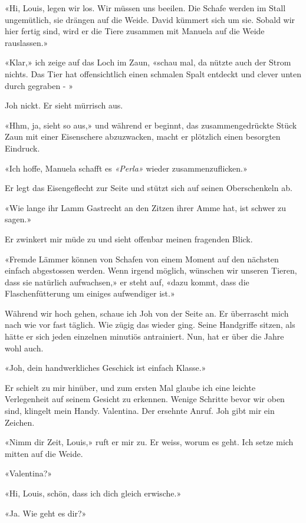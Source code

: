 «Hi, Louis, legen wir los. Wir müssen uns beeilen. Die Schafe werden im
Stall ungemütlich, sie drängen auf die Weide. David kümmert sich um sie.
Sobald wir hier fertig sind, wird er die Tiere zusammen mit Manuela auf
die Weide rauslassen.»

«Klar,» ich zeige auf das Loch im Zaun, «schau mal, da nützte auch der
Strom nichts. Das Tier hat offensichtlich einen schmalen Spalt entdeckt
und clever unten durch gegraben - »

Joh nickt. Er sieht mürrisch aus.

«Hhm, ja, sieht so aus,» und während er beginnt, das zusammengedrückte
Stück Zaun mit einer Eisenschere abzuzwacken, macht er plötzlich einen besorgten Eindruck.

«Ich hoffe, Manuela schafft es \emph{«Perla»} wieder
zusammenzuflicken.»

Er legt das Eisengeflecht zur Seite und stützt sich auf seinen
Oberschenkeln ab.

«Wie lange ihr Lamm Gastrecht an den Zitzen ihrer Amme hat, ist schwer
zu sagen.»

Er zwinkert mir müde zu und sieht offenbar meinen fragenden Blick.

«Fremde Lämmer können von Schafen von einem Moment auf den nächsten
einfach abgestossen werden. Wenn irgend möglich, wünschen wir unseren
Tieren, dass sie natürlich aufwachsen,» er steht auf, «dazu kommt, dass
die Flaschenfütterung um einiges aufwendiger ist.»

\sectionbreak

Während wir hoch gehen, schaue ich Joh von der Seite an. Er überrascht
mich nach wie vor fast täglich. Wie zügig das wieder ging. Seine
Handgriffe sitzen, als hätte er sich jeden einzelnen minutiös
antrainiert. Nun, hat er über die Jahre wohl auch.

«Joh, dein handwerkliches Geschick ist einfach Klasse.»

Er schielt zu mir hinüber, und zum ersten Mal glaube ich eine leichte
Verlegenheit auf seinem Gesicht zu erkennen. 
Wenige Schritte bevor wir oben sind, klingelt mein Handy. Valentina. Der
ersehnte Anruf. Joh gibt mir ein Zeichen.

«Nimm dir Zeit, Louis,» ruft er mir zu. Er weiss, worum es geht. Ich
setze mich mitten auf die Weide.

«Valentina?»

«Hi, Louis, schön, dass ich dich gleich erwische.»

«Ja. Wie geht es dir?»

